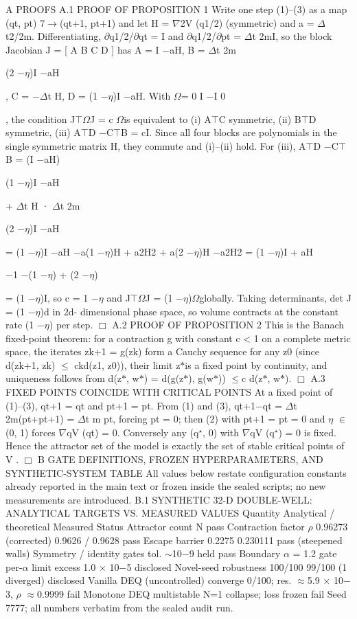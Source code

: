 \documentclass{article}
\begin{document}

A
PROOFS
A.1
PROOF OF PROPOSITION 1
Write one step (1)--(3) as a map (qt, pt) 7$\to$(qt+1, pt+1) and let H = $\nabla$2V (q1/2) (symmetric)
and a = $\Delta$t2/2m. Differentiating, $\partial$q1/2/$\partial$qt = I and $\partial$q1/2/$\partial$pt =
$\Delta$t
2mI, so the block Jacobian
J = [ A B
C D ] has
A = I $-$aH,
B = $\Delta$t
2m

(2 $-$$\eta$)I $-$aH

,
C = $-$$\Delta$t H,
D = (1 $-$$\eta$)I $-$aH.
With $\Omega$=
 0
I
$-$I 0

, the condition J$\top$$\Omega$J = c $\Omega$is equivalent to (i) A$\top$C symmetric, (ii) B$\top$D
symmetric, (iii) A$\top$D $-$C$\top$B = cI. Since all four blocks are polynomials in the single symmetric
matrix H, they commute and (i)--(ii) hold. For (iii),
A$\top$D $-$C$\top$B = (I $-$aH)

(1 $-$$\eta$)I $-$aH

+ $\Delta$t H · $\Delta$t
2m

(2 $-$$\eta$)I $-$aH

= (1 $-$$\eta$)I $-$aH $-$a(1 $-$$\eta$)H + a2H2 + a(2 $-$$\eta$)H $-$a2H2
= (1 $-$$\eta$)I + aH

$-$1 $-$(1 $-$$\eta$) + (2 $-$$\eta$)

= (1 $-$$\eta$)I,
so c = 1 $-$$\eta$ and J$\top$$\Omega$J = (1 $-$$\eta$)$\Omega$globally. Taking determinants, det J = (1 $-$$\eta$)d in 2d-
dimensional phase space, so volume contracts at the constant rate (1 $-$$\eta$) per step.
$\Box$
A.2
PROOF OF PROPOSITION 2
This is the Banach fixed-point theorem: for a contraction g with constant c < 1 on a complete
metric space, the iterates zk+1 = g(zk) form a Cauchy sequence for any z0 (since d(zk+1, zk) $\le$
ckd(z1, z0)), their limit z$*$is a fixed point by continuity, and uniqueness follows from d(z$*$, w$*$) =
d(g(z$*$), g(w$*$)) $\le$c d(z$*$, w$*$).
$\Box$
A.3
FIXED POINTS COINCIDE WITH CRITICAL POINTS
At a fixed point of (1)--(3), qt+1 = qt and pt+1 = pt. From (1) and (3), qt+1$-$qt = $\Delta$t
2m(pt+pt+1) =
$\Delta$t
m pt, forcing pt = 0; then (2) with pt+1 = pt = 0 and $\eta$ $\in$(0, 1) forces $\nabla$qV (qt) = 0. Conversely
any (q$^\star$, 0) with $\nabla$qV (q$^\star$) = 0 is fixed. Hence the attractor set of the model is exactly the set of
stable critical points of V .
$\Box$
B
GATE DEFINITIONS, FROZEN HYPERPARAMETERS, AND
SYNTHETIC-SYSTEM TABLE
All values below restate configuration constants already reported in the main text or frozen inside
the sealed scripts; no new measurements are introduced.
B.1
SYNTHETIC 32-D DOUBLE-WELL: ANALYTICAL TARGETS VS. MEASURED VALUES
Quantity
Analytical / theoretical
Measured
Status
Attractor count N
pass
Contraction factor $\rho$
0.96273 (corrected)
0.9626 / 0.9628
pass
Escape barrier
0.2275
0.230111
pass (steepened walls)
Symmetry / identity gates
tol. $\sim$10$-$9
held
pass
Boundary $\alpha$ = 1.2 gate
per-$\alpha$ limit
excess 1.0 $\times$ 10$-$5
disclosed
Novel-seed robustness
100/100
99/100 (1 diverged)
disclosed
Vanilla DEQ (uncontrolled)
converge
0/100; res. $\approx$5.9 $\times$ 10$-$3, $\rho$ $\approx$0.9999
fail
Monotone DEQ
multistable
N=1 collapse; loss frozen
fail
Seed 7777; all numbers verbatim from the sealed audit run.
\clearpage
\end{document}
